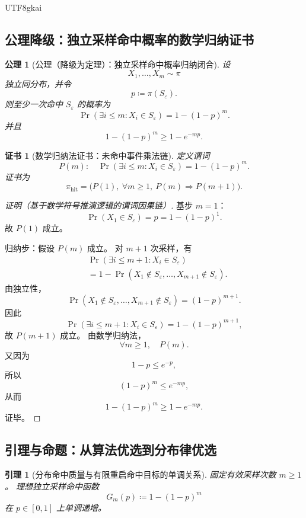 \documentclass[12pt]{article}
\newtheorem{axiom}{公理}[section]
\newtheorem{lemma}{引理}[section]
\newtheorem{Certificate}{证书}[section]
\newcommand{\DefEq}{\coloneqq}
\begin{document}
\begin{CJK*}{UTF8}{gkai}
\subsection{公理降级：独立采样命中概率的数学归纳证书}
\label{subsec:tex55-hit-induction-law}

\begin{axiom}[公理（降级为定理）：独立采样命中概率归纳闭合]
\label{ax:tex55-iid-hit-induction}
设
\[
  X_1,\ldots,X_m\sim\pi
\]
独立同分布，并令
\[
  p\DefEq\pi(S_\varepsilon).
\]
则至少一次命中 \(S_\varepsilon\) 的概率为
\[
  \Pr(\exists i\le m:X_i\in S_\varepsilon)
  =
  1-(1-p)^m.
\]
并且
\[
  1-(1-p)^m\ge 1-e^{-mp}.
\]
\end{axiom}

\begin{Certificate}[数学归纳法证书：未命中事件乘法链]
\label{cert:tex55-iid-hit-induction}
定义谓词
\[
  P(m):\quad
  \Pr(\exists i\le m:X_i\in S_\varepsilon)
  =
  1-(1-p)^m.
\]
证书为
\[
  \pi_{\mathrm{hit}}
  =
  \bigl(P(1),\ \forall m\ge1,\ P(m)\Rightarrow P(m+1)\bigr).
\]
\end{Certificate}

\begin{proof}[证明（基于数学符号推演逻辑的谓词因果链）]
基步 \(m=1\)：
\[
  \Pr(X_1\in S_\varepsilon)=p
  =
  1-(1-p)^1.
\]
故 \(P(1)\) 成立。

归纳步：假设 \(P(m)\) 成立。
对 \(m+1\) 次采样，有
\[
\begin{aligned}
  &\Pr(\exists i\le m+1:X_i\in S_\varepsilon)\\
  &=
  1-
  \Pr(X_1\notin S_\varepsilon,\ldots,X_{m+1}\notin S_\varepsilon).
\end{aligned}
\]
由独立性，
\[
  \Pr(X_1\notin S_\varepsilon,\ldots,X_{m+1}\notin S_\varepsilon)
  =
  (1-p)^{m+1}.
\]
因此
\[
  \Pr(\exists i\le m+1:X_i\in S_\varepsilon)
  =
  1-(1-p)^{m+1},
\]
故 \(P(m+1)\) 成立。
由数学归纳法，
\[
  \forall m\ge1,\quad P(m).
\]
又因为
\[
  1-p\le e^{-p},
\]
所以
\[
  (1-p)^m\le e^{-mp},
\]
从而
\[
  1-(1-p)^m\ge1-e^{-mp}.
\]
证毕。
\end{proof}

\subsection{引理与命题：从算法优选到分布律优选}
\label{subsec:tex55-selection-proposition}

\begin{lemma}[分布命中质量与有限重启命中目标的单调关系]
\label{lem:tex55-hit-quality-monotone}
固定有效采样次数 \(m\ge1\)。
理想独立采样命中函数
\[
  G_m(p)\DefEq1-(1-p)^m
\]
在 \(p\in[0,1]\) 上单调递增。
\end{lemma}


\end{CJK*}
\end{document}
